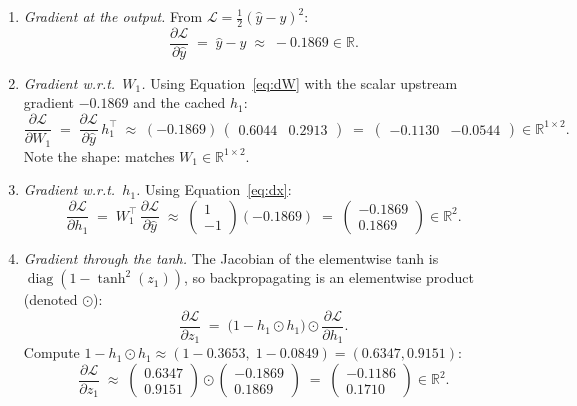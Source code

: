 \documentclass[11pt, a4paper]{article}
\newcommand{\R}{\mathbb{R}}
\newcommand{\diag}{\operatorname{diag}}
\newcommand{\T}{^{\!\top}}
\newcommand{\Loss}{\mathcal{L}}
\begin{document}
\begin{enumerate}[leftmargin=*, label=(\arabic*)]
    \item \emph{Gradient at the output.} From $\Loss = \tfrac{1}{2}(\hat y - y)^2$:
    \[
        \frac{\partial \Loss}{\partial \hat y} \;=\; \hat y - y \;\approx\; -0.1869 \in \R.
    \]

    \item \emph{Gradient w.r.t.\ $W_1$.} Using Equation~\eqref{eq:dW} with the scalar upstream gradient $-0.1869$ and the cached $h_1$:
    \[
        \frac{\partial \Loss}{\partial W_1} \;=\; \frac{\partial \Loss}{\partial \hat y}\, h_1\T
        \;\approx\; (-0.1869)\,\begin{pmatrix} 0.6044 & 0.2913 \end{pmatrix}
        \;=\; \begin{pmatrix} -0.1130 & -0.0544 \end{pmatrix} \in \R^{1 \times 2}.
    \]
    Note the shape: matches $W_1 \in \R^{1\times 2}$.

    \item \emph{Gradient w.r.t.\ $h_1$.} Using Equation~\eqref{eq:dx}:
    \[
        \frac{\partial \Loss}{\partial h_1} \;=\; W_1\T\, \frac{\partial \Loss}{\partial \hat y}
        \;\approx\; \begin{pmatrix} 1 \\ -1 \end{pmatrix}(-0.1869)
        \;=\; \begin{pmatrix} -0.1869 \\ 0.1869 \end{pmatrix} \in \R^2.
    \]

    \item \emph{Gradient through the tanh.} The Jacobian of the elementwise tanh is $\diag(1 - \tanh^2(z_1))$, so backpropagating is an elementwise product (denoted $\odot$):
    \[
        \frac{\partial \Loss}{\partial z_1} \;=\; \bigl(1 - h_1 \odot h_1\bigr) \odot \frac{\partial \Loss}{\partial h_1}.
    \]
    Compute $1 - h_1 \odot h_1 \approx (1 - 0.3653,\; 1 - 0.0849) = (0.6347, 0.9151)$:
    \[
        \frac{\partial \Loss}{\partial z_1} \;\approx\; \begin{pmatrix} 0.6347 \\ 0.9151 \end{pmatrix} \odot \begin{pmatrix} -0.1869 \\ 0.1869 \end{pmatrix}
        \;=\; \begin{pmatrix} -0.1186 \\ 0.1710 \end{pmatrix} \in \R^2.
    \]


\end{enumerate}
\end{document}
